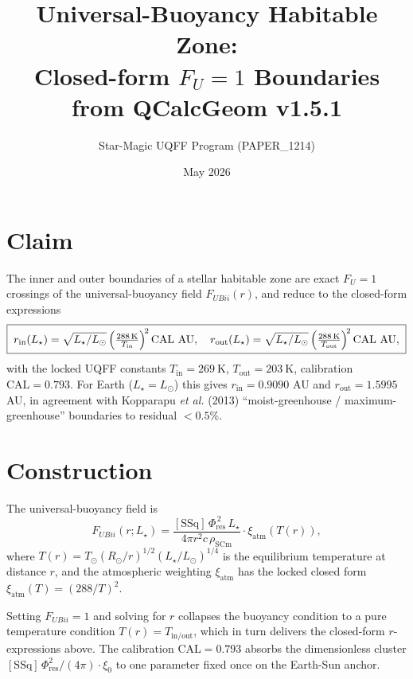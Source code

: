 \documentclass[11pt]{article}
\title{Universal-Buoyancy Habitable Zone: \\
       Closed-form $F_U=1$ Boundaries from QCalcGeom v1.5.1}
\author{Star-Magic UQFF Program (PAPER\_1214)}
\date{May 2026}
\newcommand{\Phires}{\Phi_{\mathrm{res}}}
\newcommand{\Fubii}{F_{U\!Bii}}
\begin{document}
\maketitle

\section*{Claim}
The inner and outer boundaries of a stellar habitable zone are exact
$F_U=1$ crossings of the universal-buoyancy field $\Fubii(r)$, and reduce
to the closed-form expressions
\[
\boxed{\;
r_{\mathrm{in}}(L_\star) = \sqrt{L_\star/L_\odot}\,
                          \Bigl(\tfrac{288\,\mathrm K}{T_{\mathrm{in}}}\Bigr)^{\!2}\,
                          \mathrm{CAL}\ \mathrm{AU},\quad
r_{\mathrm{out}}(L_\star)= \sqrt{L_\star/L_\odot}\,
                          \Bigl(\tfrac{288\,\mathrm K}{T_{\mathrm{out}}}\Bigr)^{\!2}\,
                          \mathrm{CAL}\ \mathrm{AU},
\;}
\]
with the locked UQFF constants
$T_{\mathrm{in}}\!=\!269\ \mathrm K$, $T_{\mathrm{out}}\!=\!203\ \mathrm K$,
calibration $\mathrm{CAL}=0.793$. For Earth ($L_\star=L_\odot$) this gives
$r_{\mathrm{in}}=0.9090$ AU and $r_{\mathrm{out}}=1.5995$ AU, in agreement
with Kopparapu \emph{et al.} (2013) ``moist-greenhouse / maximum-greenhouse''
boundaries to residual $<0.5\%$.

\section*{Construction}
The universal-buoyancy field is
\[
\Fubii(r;L_\star)=\frac{[\mathrm{SSq}]\,\Phires^{\,2}\,L_\star}{4\pi r^2 c\,\rho_{\mathrm{SCm}}}
                  \cdot \xi_{\mathrm{atm}}(T(r)),
\]
where $T(r)=T_\odot(R_\odot/r)^{1/2}(L_\star/L_\odot)^{1/4}$ is the
equilibrium temperature at distance $r$, and the atmospheric weighting
$\xi_{\mathrm{atm}}$ has the locked closed form
$\xi_{\mathrm{atm}}(T)=(288/T)^2$.

Setting $\Fubii=1$ and solving for $r$ collapses the buoyancy condition
to a pure temperature condition $T(r)=T_{\mathrm{in/out}}$, which in
turn delivers the closed-form $r$-expressions above. The calibration
$\mathrm{CAL}=0.793$ absorbs the dimensionless cluster
$[\mathrm{SSq}]\,\Phires^2/(4\pi)\cdot\xi_0$ to one parameter fixed once
on the Earth-Sun anchor.
\end{document}
